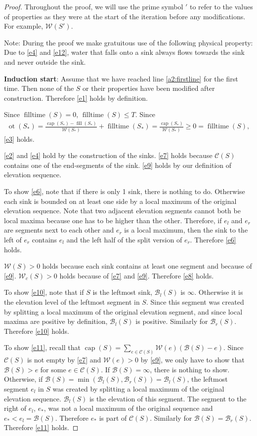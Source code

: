 \documentclass[11pt,a4paper]{article}
\newcommand{\Br}{\mathcal{B}_r}
\newcommand{\Bl}{\mathcal{B}_l}
\newcommand{\B}{\mathcal{B}}
\newcommand{\Wc}{\mathcal{W}_c}
\newcommand{\W}{\mathcal{W}}
\newcommand{\C}{\mathcal{C}}
\DeclareMathOperator{\capp}{cap}
\DeclareMathOperator{\ot}{ot}
\DeclareMathOperator{\Fill}{fill}
\DeclareMathOperator{\filltime}{filltime}
\begin{document}
\begin{proof}
Throughout the proof, we will use the prime symbol $'$ to refer to the values of properties as they were at the start of the iteration before any modifications.
For example, $\W(S')$.

Note: During the proof we make gratuitous use of the following physical property:
Due to \ref{e4} and \ref{e12}, water that falls onto a sink always flows towards the sink and never outside the sink.

\textbf{Induction start}: Assume that we have reached line \ref{a2:firstline} for the first time.
Then none of the $S$ or their properties have been modified after construction.
Therefore \ref{e1} holds by definition.

Since $\filltime(S) = 0$, $\filltime(S) \le T$.
Since
\begin{align*}
    \ot(S_*) = \frac{\capp(S_*) - \Fill(S_*)}{\W(S_*)} + \filltime(S_*)
           = \frac{\capp(S_*)}{\W(S_*)}
           \ge 0 = \filltime(S),
\end{align*}
\ref{e3} holds.

\ref{e2} and \ref{e4} hold by the construction of the sinks. 
\ref{e7} holds because $\C(S)$ contains one of the end-segments of the sink.
\ref{e9} holds by our definition of elevation sequence.

To show \ref{e6}, note that if there is only 1 sink, there is nothing to do.
Otherwise each sink is bounded on at least one side by a local maximum of the original elevation sequence.
Note that two adjacent elevation segments cannot both be local maxima because one has to be higher than the other.
Therefore, if $e_l$ and $e_r$ are segments next to each other and $e_r$ is a local maximum, then
the sink to the left of $e_r$ contains $e_l$ and the left half of the split version of $e_r$.
Therefore \ref{e6} holds.

$\W(S) > 0$ holds because each sink contains at least one segment and because of \ref{e9}.
$\Wc(S) > 0$ holds because of \ref{e7} and \ref{e9}.
Therefore \ref{e8} holds.

To show \ref{e10}, note that if $S$ is the leftmost sink, $\Bl(S)$ is $\infty$.
Otherwise it is the elevation level of the leftmost segment in $S$.
Since this segment was created by splitting a local maximum of the original elevation segment, and since local maxima are positive by definition, $\Bl(S)$ is positive.
Similarly for $\Br(S)$.
Therefore \ref{e10} holds.

To show \ref{e11}, recall that $\capp(S) = \sum_{e\in\C(S)} \W(e)(\B(S)-e)$.
Since $\C(S)$ is not empty by \ref{e7} and $\W(e) > 0$ by \ref{e9}, we only have
to show that $\B(S) > e$ for some $e\in\C(S)$.
If $\B(S)=\infty$, there is nothing to show.
Otherwise, if $\B(S) = \min(\Bl(S), \Br(S)) = \Bl(S)$, the leftmost segment $e_l$ in $S$ was created by splitting a local maximum of the original elevation sequence.
$\Bl(S)$ is the elevation of this segment.
The segment to the right of $e_l$, $e_*$, was not a local maximum of the original sequence and $e_* < e_l = \B(S)$.
Therefore $e_*$ is part of $\C(S)$.
Similarly for $\B(S) = \Br(S)$.
Therefore \ref{e11} holds.


\end{proof}
\end{document}
